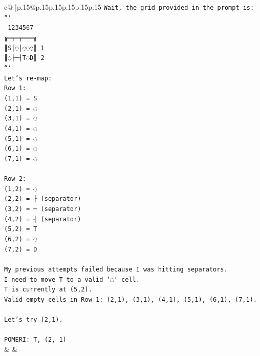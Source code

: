 \documentclass{article}
\begin{document}
{\begin{supertabular}{c@{$\;$}|p{.15\linewidth}@{}p{.15\linewidth}p{.15\linewidth}p{.15\linewidth}p{.15\linewidth}p{.15\linewidth}}
{{{\texttt{Wait, the grid provided in the prompt is:} \\
\texttt{```} \\
\texttt{ 1234567} \\
\texttt{╔═╤═╤═══╗} \\
\texttt{║S│◌│◌◌◌║ 1} \\
\texttt{║◌├─┤T◌D║ 2} \\
\texttt{```} \\
\texttt{Let's re{-}map:} \\
\texttt{Row 1:} \\
\texttt{(1,1) = S} \\
\texttt{(2,1) = ◌} \\
\texttt{(3,1) = ◌} \\
\texttt{(4,1) = ◌} \\
\texttt{(5,1) = ◌} \\
\texttt{(6,1) = ◌} \\
\texttt{(7,1) = ◌} \\
\\ 
\texttt{Row 2:} \\
\texttt{(1,2) = ◌} \\
\texttt{(2,2) = ├ (separator)} \\
\texttt{(3,2) = ─ (separator)} \\
\texttt{(4,2) = ┤ (separator)} \\
\texttt{(5,2) = T} \\
\texttt{(6,2) = ◌} \\
\texttt{(7,2) = D} \\
\\ 
\texttt{My previous attempts failed because I was hitting separators.} \\
\texttt{I need to move T to a valid `◌` cell.} \\
\texttt{T is currently at (5,2).} \\
\texttt{Valid empty cells in Row 1: (2,1), (3,1), (4,1), (5,1), (6,1), (7,1).} \\
\\ 
\texttt{Let's try (2,1).} \\
\\ 
\texttt{POMERI: T, (2, 1)} \\
            }
        }
    }
    & & \\ \\


\end{supertabular}}
\end{document}
